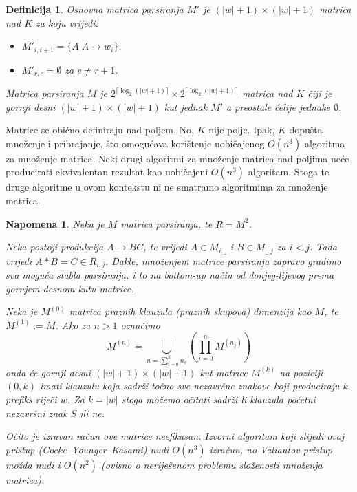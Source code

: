 \documentclass[a4paper,oneside,12pt]{article} %
\newtheorem{lmdef}{Definicija}
\newtheorem{lmnap}{Napomena}
\begin{document}
    \begin{lmdef}
        Osnovna matrica parsiranja $M'$ je $(|w| + 1) \times (|w| + 1)$ 
            matrica nad $K$ za koju vrijedi:
        \begin{itemize}
            \item $M'_{i, i+1} = \{A | A \to w_i\}$.
            \item $M'_{r, c} = \emptyset$ za $c \neq r + 1$.
        \end{itemize}
        Matrica parsiranja $M$ je 
            $2^{\lceil \log_2 (|w| + 1) \rceil } \times 2^{\lceil \log_2 (|w| + 1) \rceil }$
            matrica nad $K$ čiji je gornji desni $(|w| + 1) \times (|w| + 1)$ kut jednak $M'$
            a preostale ćelije jednake $\emptyset$.
    \end{lmdef}
    
    Matrice se obično definiraju nad poljem.
    No, $K$ nije polje. 
    Ipak, $K$ dopušta množenje i pribrajanje, što omogućava korištenje
        uobičajenog $O(n^3)$ algoritma za množenje matrica.
    Neki drugi algoritmi za množenje matrica nad poljima
        neće producirati ekvivalentan rezultat 
        kao uobičajeni $O(n^3)$ algoritam.
    Stoga te druge algoritme u ovom kontekstu ni ne smatramo
        algoritmima za množenje matrica.
    
    \begin{lmnap}
        Neka je $M$ matrica parsiranja, te $R = M^2$.
        
        Neka postoji produkcija $A \to BC$, te vrijedi $A \in M_{i,\_}$ i $B \in M_{\_, j}$
            za $i < j$.
        Tada vrijedi $A*B = C \in R_{i,j}$.
        Dakle, množenjem matrice parsiranja zapravo gradimo sva moguća
            stabla parsiranja, i to na \emph{bottom-up} način 
            od donjeg-lijevog prema gornjem-desnom kutu matrice.
            
        
        Neka je $M^{(0)}$ matrica praznih klauzula (praznih skupova) dimenzija kao $M$,
        te $M^{(1)} := M$.
        Ako za $n > 1$ označimo 
        \[
            M ^{(n)} = \bigcup_{n = \sum_{i = 0}^{k} n_i} \left( \prod_{j = 0}^n M^{(n_j)} \right)
        \]
        onda će gornji desni $(|w| + 1) \times (|w| + 1)$ kut matrice $M^{(k)}$ na poziciji 
            $(0, k)$ imati klauzulu koja sadrži točno sve nezavršne znakove
            koji produciraju $k$-prefiks riječi $w$.
        Za $k = |w|$ stoga možemo očitati sadrži li klauzula početni nezavršni znak
            $S$ ili ne.    
            
        Očito je izravan račun ove matrice neefikasan. 
        Izvorni algoritam koji slijedi ovaj pristup (Cocke–Younger–Kasami)
            nudi $O(n^3)$ izračun,
            no Valiantov pristup možda nudi i $O(n^2)$ 
            (ovisno o neriješenom problemu složenosti množenja matrica).
    \end{lmnap}
    
\end{document}
